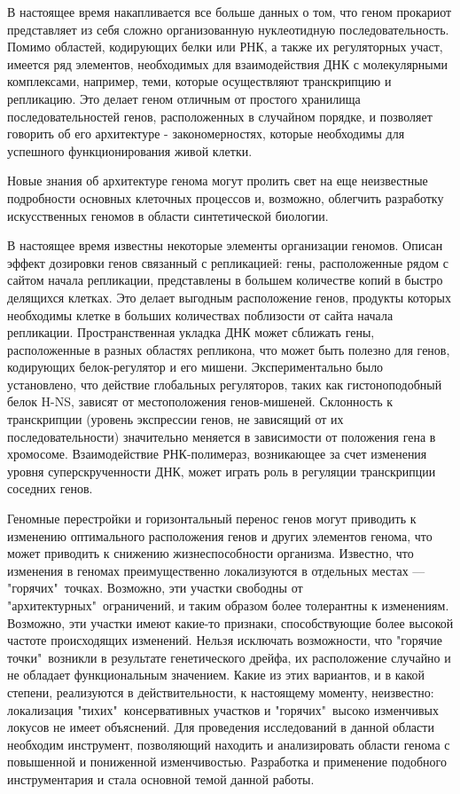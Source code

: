 
{\actuality} В настоящее время накапливается все больше данных о том, что геном прокариот представляет из себя сложно организованную нуклеотидную последовательность. Помимо областей, кодирующих белки или РНК, а также их регуляторных участ, имеется ряд элементов, необходимых для взаимодействия ДНК с молекулярными комплексами, например, теми, которые осуществляют транскрипцию и репликацию. Это делает геном отличным от простого хранилища последовательностей генов, расположенных в случайном порядке, и позволяет говорить об его архитектуре - закономерностях, которые необходимы для успешного функционирования живой клетки.

Новые знания об архитектуре генома могут пролить свет на еще неизвестные подробности основных клеточных процессов и, возможно, облегчить разработку искусственных геномов в области синтетической биологии.


{\progress}
В настоящее время известны некоторые элементы организации геномов. Описан эффект дозировки генов связанный с репликацией: гены, расположенные рядом с сайтом начала репликации, представлены в большем количестве копий в быстро делящихся клетках. Это делает выгодным расположение генов, продукты которых необходимы клетке в больших количествах поблизости от сайта начала репликации. Пространственная укладка ДНК может сближать гены, расположенные в разных областях репликона, что может быть полезно для генов, кодирующих белок-регулятор и его мишени. Экспериментально было установлено, что действие глобальных регуляторов, таких как гистоноподобный белок H-NS, зависят от местоположения генов-мишеней. Склонность к транскрипции (уровень экспрессии генов, не зависящий от их последовательности) значительно меняется в зависимости от положения гена в хромосоме. Взаимодействие РНК-полимераз, возникающее за счет изменения уровня суперскрученности ДНК, может играть роль в регуляции транскрипции соседних генов.

Геномные перестройки и горизонтальный перенос генов могут приводить к изменению оптимального расположения генов и других элементов генома, что может приводить к снижению жизнеспособности организма. Известно, что изменения в геномах преимущественно локализуются в отдельных местах --- "горячих"\ точках. Возможно, эти участки свободны от "архитектурных"\ ограничений, и таким образом более толерантны к изменениям. Возможно, эти участки имеют какие-то признаки, способствующие более высокой частоте происходящих изменений. Нельзя исключать возможности, что "горячие точки"\ возникли в результате генетического дрейфа, их расположение случайно и не обладает функциональным значением. Какие из этих вариантов, и в какой степени, реализуются в действительности, к настоящему моменту, неизвестно: локализация "тихих"\ консервативных участков и "горячих"\ высоко изменчивых локусов не имеет объяснений. Для проведения исследований в данной области необходим инструмент, позволяющий находить и анализировать области генома с повышенной и пониженной изменчивостью. Разработка и применение подобного инструментария и стала основной темой данной работы. 

